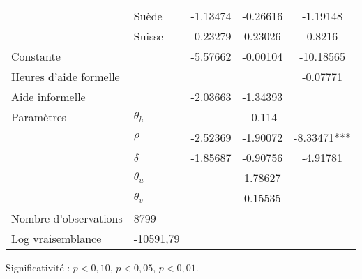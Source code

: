 \begin{Article}
\begin{refsection}[Bonnal]
\begin{table}
{\begin{threeparttable}
\begin{tabular}{l@{\quad}l@{} S!{\quad}S!{\quad}S!{\quad}}
		& Suède & -1.13474\sym{***} & -0.26616\sym{*} & -1.19148\sym{**} \\
		& Suisse & -0.23279\sym{*} & 0.23026 & 0.8216\sym{*} \\\hline
		Constante& & -5.57662\sym{***} & -0.00104 & -10.18565\sym{***} \\\hline\hline
		Heures d'aide formelle & & & & -0.07771\sym{***} \\
		Aide informelle & & -2.03663\sym{***} & -1.34393\sym{***} &\\\hline\hline
		Paramètres & $\theta_h$ & & -0.114 & \\
		& $\rho$ & -2.52369\sym{***} & -1.90072\sym{***} & -8.33471***\\
		& $\delta$ &-1.85687\sym{***} & -0.90756\sym{***} & -4.91781\sym{***}\\\cline{2-5}
		& $\theta_u$ && 1.78627\sym{***} &\\
		& $\theta_v$ && 0.15535\sym{*} &\\\hline
	Nombre d'observations & 8799 &&&\\\hline
	Log vraisemblance & -10591,79 &&&\\\hline\hline
	\end{tabular}
\begin{tablenotes} \footnotesize
\item Significativité : \sym{*} $p<0,10$, \sym{**} $p<0,05$, \sym{***} $p<0,01$.
\end{tablenotes}
\end{threeparttable}
}
\end{table}


\end{refsection}
\end{Article}
